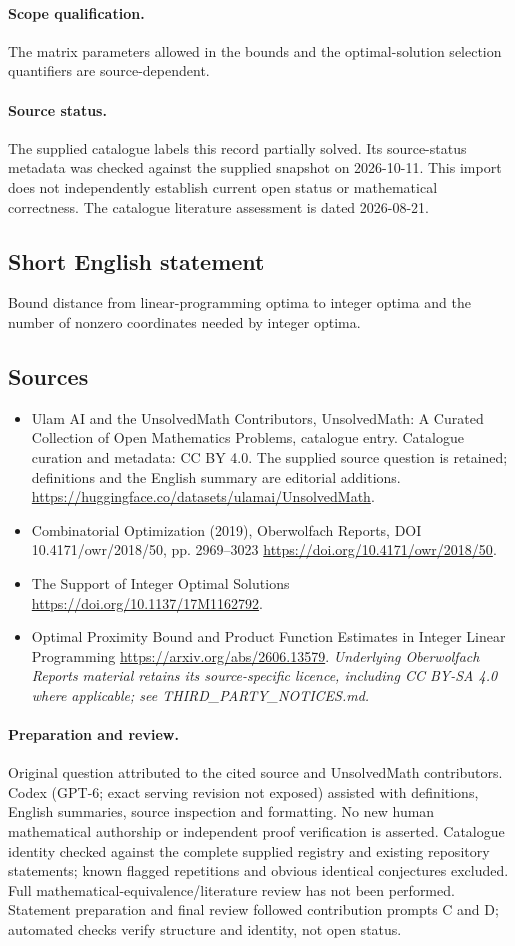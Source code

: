 \documentclass[11pt]{article}
\begin{document}
\paragraph{Scope qualification.}
The matrix parameters allowed in the bounds and the optimal-solution selection quantifiers are source-dependent.
\paragraph{Source status.}
The supplied catalogue labels this record partially solved. Its source-status metadata was checked against the supplied snapshot on 2026-10-11. This import does not independently establish current open status or mathematical correctness. The catalogue literature assessment is dated 2026-08-21.
\subsection{Short English statement}
Bound distance from linear-programming optima to integer optima and the number of nonzero coordinates needed by integer optima.
\subsection{Sources}
\begin{itemize}
\item[S1] Ulam AI and the UnsolvedMath Contributors, UnsolvedMath: A Curated Collection of Open Mathematics Problems, catalogue entry. Catalogue curation and metadata: CC BY 4.0. The supplied source question is retained; definitions and the English summary are editorial additions.
\url{https://huggingface.co/datasets/ulamai/UnsolvedMath}.
\item[S2] Combinatorial Optimization (2019), Oberwolfach Reports, DOI 10.4171/owr/2018/50, pp. 2969--3023
\url{https://doi.org/10.4171/owr/2018/50}.
\item[S3] The Support of Integer Optimal Solutions
\url{https://doi.org/10.1137/17M1162792}.
\item[S4] Optimal Proximity Bound and Product Function Estimates in Integer Linear Programming
\url{https://arxiv.org/abs/2606.13579}.
\textit{Underlying Oberwolfach Reports material retains its source-specific licence, including CC BY-SA 4.0 where applicable; see THIRD\_PARTY\_NOTICES.md.}
\end{itemize}
\paragraph{Preparation and review.}
Original question attributed to the cited source and UnsolvedMath contributors. Codex (GPT-6; exact serving revision not exposed) assisted with definitions, English summaries, source inspection and formatting. No new human mathematical authorship or independent proof verification is asserted. Catalogue identity checked against the complete supplied registry and existing repository statements; known flagged repetitions and obvious identical conjectures excluded. Full mathematical-equivalence/literature review has not been performed. Statement preparation and final review followed contribution prompts C and D; automated checks verify structure and identity, not open status.
\label{end:statement}
\end{document}
